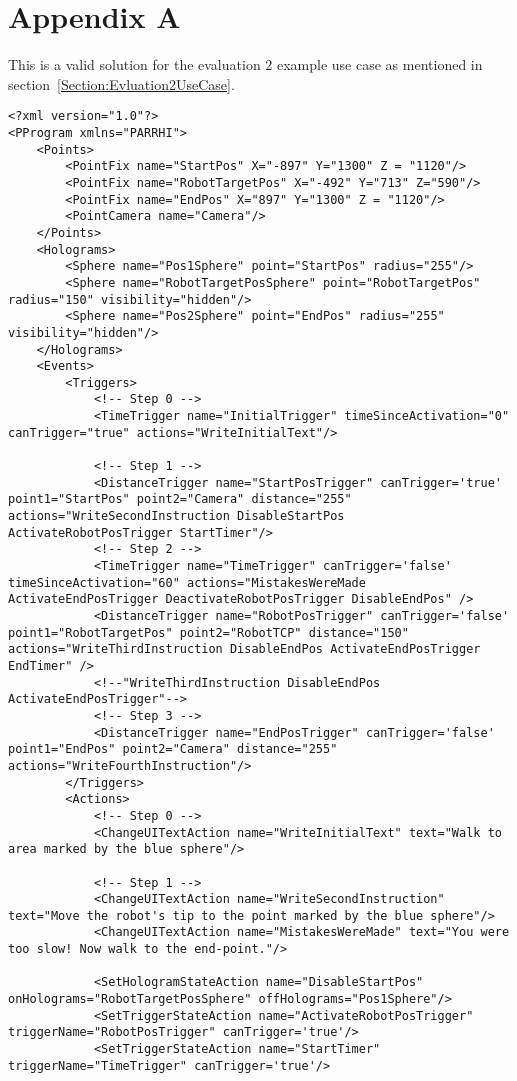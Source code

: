\chapter{Appendix A}

This is a valid solution for the evaluation 2 example use case as mentioned in section~\ref{Section:Evluation2UseCase}.

\begin{lstlisting}
<?xml version="1.0"?>
<PProgram xmlns="PARRHI">
	<Points>
		<PointFix name="StartPos" X="-897" Y="1300" Z = "1120"/>
		<PointFix name="RobotTargetPos" X="-492" Y="713" Z="590"/>
		<PointFix name="EndPos" X="897" Y="1300" Z = "1120"/>
		<PointCamera name="Camera"/>
	</Points>
	<Holograms>
		<Sphere name="Pos1Sphere" point="StartPos" radius="255"/>
		<Sphere name="RobotTargetPosSphere" point="RobotTargetPos" radius="150" visibility="hidden"/>
		<Sphere name="Pos2Sphere" point="EndPos" radius="255" visibility="hidden"/>		
	</Holograms>
	<Events>
		<Triggers>		
			<!-- Step 0 -->
			<TimeTrigger name="InitialTrigger" timeSinceActivation="0" canTrigger="true" actions="WriteInitialText"/>
			
			<!-- Step 1 -->
			<DistanceTrigger name="StartPosTrigger" canTrigger='true' point1="StartPos" point2="Camera" distance="255" actions="WriteSecondInstruction DisableStartPos ActivateRobotPosTrigger StartTimer"/>
			<!-- Step 2 -->
			<TimeTrigger name="TimeTrigger" canTrigger='false' timeSinceActivation="60" actions="MistakesWereMade ActivateEndPosTrigger DeactivateRobotPosTrigger DisableEndPos" />
			<DistanceTrigger name="RobotPosTrigger" canTrigger='false' point1="RobotTargetPos" point2="RobotTCP" distance="150" actions="WriteThirdInstruction DisableEndPos ActivateEndPosTrigger EndTimer" />
			<!--"WriteThirdInstruction DisableEndPos ActivateEndPosTrigger"-->
			<!-- Step 3 -->
			<DistanceTrigger name="EndPosTrigger" canTrigger='false' point1="EndPos" point2="Camera" distance="255" actions="WriteFourthInstruction"/>
		</Triggers>
		<Actions>
			<!-- Step 0 -->
			<ChangeUITextAction name="WriteInitialText" text="Walk to area marked by the blue sphere"/>
			
			<!-- Step 1 -->
			<ChangeUITextAction name="WriteSecondInstruction" text="Move the robot's tip to the point marked by the blue sphere"/>
			<ChangeUITextAction name="MistakesWereMade" text="You were too slow! Now walk to the end-point."/>
			
			<SetHologramStateAction name="DisableStartPos" onHolograms="RobotTargetPosSphere" offHolograms="Pos1Sphere"/>
			<SetTriggerStateAction name="ActivateRobotPosTrigger" triggerName="RobotPosTrigger" canTrigger='true'/>
			<SetTriggerStateAction name="StartTimer" triggerName="TimeTrigger" canTrigger='true'/>
			

\end{lstlisting}
